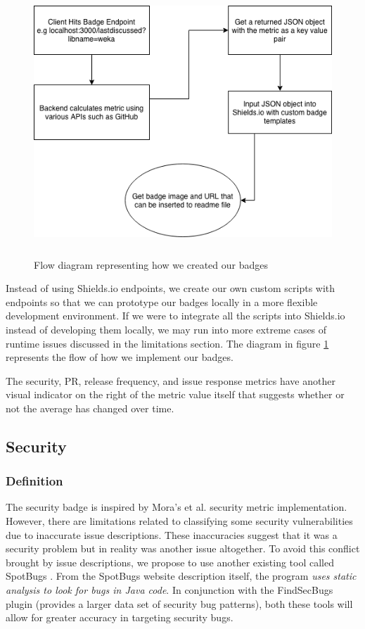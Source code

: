\documentclass[12pt, letterpaper]{article}
\begin{document}
\begin{figure}[!htb]
    \centerline{
        \includegraphics[width=18cm,height=10cm,keepaspectratio=true]{methods}
    }
    \caption{
        Flow diagram representing how we created our badges
    }
    \label{methods}
\end{figure}

Instead of using Shields.io \cite{shields} endpoints, we create our own custom scripts with endpoints 
so that we can prototype our badges locally in a more flexible development environment.
If we were to integrate all the scripts into Shields.io \cite{shieldsrepo} instead of 
developing them locally, we may run into 
more extreme cases of runtime issues discussed in the limitations section. 
The diagram in figure \ref{methods} represents the flow of how we implement our badges.


The security, PR, release frequency, and issue response metrics have
another visual indicator on the right of the metric value itself that suggests
whether or not the average has changed over time. 

\subsection{Security}
\subsubsection{Definition}
The security badge is inspired by Mora's et al. \cite{metrics} security metric implementation.
However, there are limitations related to classifying some security vulnerabilities due to inaccurate
issue descriptions. These inaccuracies suggest that it was a security problem but in reality was another issue altogether.
To avoid this conflict brought by issue descriptions, 
we propose to use another existing tool called SpotBugs \cite{spotbugs}.
From the SpotBugs \cite{spotbugs} website description itself, the program \textit{uses static analysis to look for bugs in Java code}.
In conjunction with the FindSecBugs \cite{findsecbugs} plugin (provides a larger data set of security bug patterns), 
both these tools will allow for greater accuracy in targeting security bugs.
\end{document}
